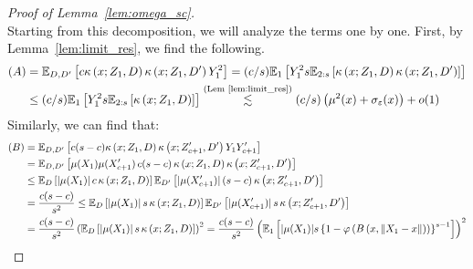 \begin{proof}[Proof of Lemma~\ref{lem:omega_sc}]
\begin{equation}
	\end{equation}
	Starting from this decomposition, we will analyze the terms one by one.
	First, by Lemma~\ref{lem:limit_res}, we find the following.
	\begin{equation}
		\begin{aligned}
            (A) & = 
			\mathbb{E}_{D, D^{\prime}}\left[c\kappa\left(x; Z_{1}, D\right)\kappa\left(x; Z_{1}, D^{\prime}\right)Y_{1}^{2}\right]
			= (c/s) \mathbb{E}_{1}\left[Y_1^2 s \mathbb{E}_{2:s}\left[\kappa\left(x; Z_{1}, D\right)\kappa\left(x; Z_{1}, D^{\prime}\right)\right]\right] \\
			 & \leq (c/s) \mathbb{E}_{1}\left[Y_1^2 s\mathbb{E}_{2:s}\left[\kappa\left(x; Z_{1}, D\right)\right]\right]                  
			\overset{\text{(Lem~\ref{lem:limit_res})}}{\lesssim} (c/s)\left(\mu^2(x) + \sigma_{\varepsilon}(x)\right) + o(1)\\
		\end{aligned}
	\end{equation}
	Similarly, we can find that:
	\begin{equation}
		\begin{aligned}
            (B)
			 & = \E_{D, D^{\prime}}\left[c(s-c) \kappa\left(x; Z_{1}, D\right)\kappa\left(x; Z_{c+1}^{\prime}, D^{\prime}\right)Y_{1}Y_{c+1}^{\prime}\right]                                          \\
			 & = \E_{D, D^{\prime}}\left[\mu(X_1)\mu(X_{c+1}^{\prime}) \, c(s-c) \, \kappa\left(x; Z_{1}, D\right)\kappa\left(x; Z_{c+1}^{\prime}, D^{\prime}\right)\right] \\
			 & \leq \E_{D}\left[|\mu(X_1)| \, c \, \kappa\left(x; Z_{1}, D\right)\right]
			\E_{D^{\prime}}\left[|\mu(X_{c+1}^{\prime})| \, (s-c) \, \kappa\left(x; Z_{c+1}^{\prime}, D^{\prime}\right)\right]                                                                               \\
			 & = \frac{c (s-c)}{s^2} \leq \E_{D}\left[|\mu(X_1)| \, s \, \kappa\left(x; Z_{1}, D\right)\right]
			\E_{D^{\prime}}\left[|\mu(X_{c+1}^{\prime})| \, s \, \kappa\left(x; Z_{c+1}^{\prime}, D^{\prime}\right)\right]                                                                                   \\
			 & = \frac{c (s-c)}{s^2} \left(\E_{D}\left[|\mu(X_1)| \, s \, \kappa\left(x; Z_{1}, D\right)\right]\right)^2                                                                       
			= \frac{c (s-c)}{s^2} \left(\E_{1}\left[|\mu(X_1)| s\left\{1 - \varphi\left(B\left(x, \|X_1 - x\|\right)\right)\right\}^{s-1}\right]\right)^2                          \\

\end{aligned}
\end{equation}
\end{proof}

